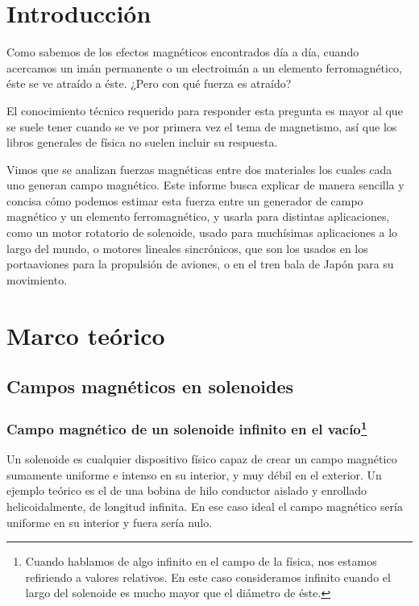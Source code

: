 \documentclass[a4paper,12pt]{article}
\begin{document}
    

\section*{Introducción}

    Como sabemos de los efectos magnéticos encontrados día a día, cuando acercamos un imán permanente o un electroimán a un elemento ferromagnético, éste se ve atraído a éste. ¿Pero con qué fuerza es atraído?

    El conocimiento técnico requerido para responder esta pregunta es mayor al que se suele tener cuando se ve por primera vez el tema de magnetismo, así que los libros generales de física no suelen incluir su respuesta. 
    
    Vimos que se analizan fuerzas magnéticas entre dos materiales los cuales cada uno generan campo magnético. Este informe busca explicar de manera sencilla y concisa cómo podemos estimar esta fuerza entre un generador de campo magnético y un elemento ferromagnético, y usarla para distintas aplicaciones, como un motor rotatorio de solenoide, usado para muchísimas aplicaciones a lo largo del mundo, o motores lineales sincrónicos, que son los usados en los portaaviones para la propulsión de aviones, o en el tren bala de Japón para su movimiento.

\section*{Marco teórico}

    \subsection*{Campos magnéticos en solenoides}

    \subsubsection*{Campo magnético de un solenoide infinito en el vacío\footnote{Cuando hablamos de algo infinito en el campo de la física, nos estamos refiriendo a valores relativos. En este caso consideramos infinito cuando el largo del solenoide es mucho mayor que el diámetro de éste.}}

        Un solenoide es cualquier dispositivo físico capaz de crear un campo magnético sumamente uniforme e intenso en su interior, y muy débil en el exterior. Un ejemplo teórico es el de una bobina de hilo conductor aislado y enrollado helicoidalmente, de longitud infinita. En ese caso ideal el campo magnético sería uniforme en su interior y fuera sería nulo.
\end{document}
